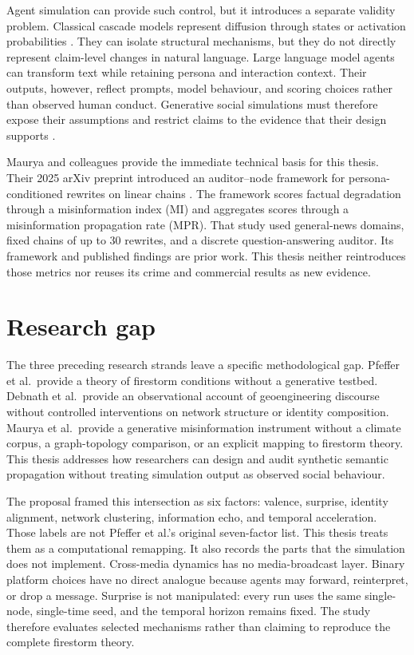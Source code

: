 Agent simulation can provide such control, but it introduces a separate validity problem.
Classical cascade models represent diffusion through states or activation probabilities \parencite{kempe2003influence}.
They can isolate structural mechanisms, but they do not directly represent claim-level changes in natural language.
Large language model agents can transform text while retaining persona and interaction context.
Their outputs, however, reflect prompts, model behaviour, and scoring choices rather than observed human conduct.
Generative social simulations must therefore expose their assumptions and restrict claims to the evidence that their design supports \parencite{sargent2013verification,larooij2025validation}.

Maurya and colleagues provide the immediate technical basis for this thesis.
Their 2025 arXiv preprint introduced an auditor--node framework for
persona-conditioned rewrites on linear chains \parencite{maurya2025simulating}.
The framework scores factual degradation through a misinformation index (MI) and aggregates scores through a misinformation propagation rate (MPR).
That study used general-news domains, fixed chains of up to 30 rewrites, and a discrete question-answering auditor.
Its framework and published findings are prior work.
This thesis neither reintroduces those metrics nor reuses its crime and commercial results as new evidence.

\section{Research gap}
\label{sec:introduction_gap}

The three preceding research strands leave a specific methodological gap.
Pfeffer et al.\ provide a theory of firestorm conditions without a generative testbed.
Debnath et al.\ provide an observational account of geoengineering discourse without controlled interventions on network structure or identity composition.
Maurya et al.\ provide a generative misinformation instrument without a climate corpus, a graph-topology comparison, or an explicit mapping to firestorm theory.
This thesis addresses how researchers can design and audit synthetic semantic
propagation without treating simulation output as observed social behaviour.

The proposal framed this intersection as six factors: valence, surprise, identity alignment, network clustering, information echo, and temporal acceleration.
Those labels are not Pfeffer et al.'s original seven-factor list.
This thesis treats them as a computational remapping.
It also records the parts that the simulation does not implement.
Cross-media dynamics has no media-broadcast layer.
Binary platform choices have no direct analogue because agents may forward, reinterpret, or drop a message.
Surprise is not manipulated: every run uses the same single-node,
single-time seed, and the temporal horizon remains fixed.
The study therefore evaluates selected mechanisms rather than claiming to reproduce the complete firestorm theory.

